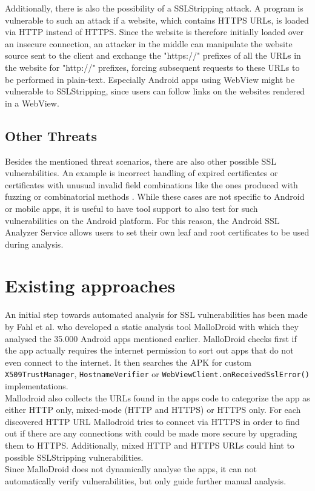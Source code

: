 \documentclass[draft,final]{vutinfth} %
\begin{document}
Additionally, there is also the possibility of a SSLStripping attack. A program is vulnerable to such an attack if a website, which contains HTTPS URLs, is loaded via HTTP instead of HTTPS. Since the website is therefore initially loaded over an insecure connection, an attacker in the middle can manipulate the website source sent to the client and exchange the "https://" prefixes of all the URLs in the website for "http://" prefixes, forcing subsequent requests to these URLs to be performed in plain-text. Especially Android apps using WebView might be vulnerable to SSLStripping, since users can follow links on the websites rendered in a WebView.

\section*{Other Threats}

Besides the mentioned threat scenarios, there are also other possible SSL vulnerabilities. An example is incorrect handling of expired certificates or certificates with unusual invalid field combinations like the ones produced with fuzzing or combinatorial methods \cite{Brubaker, Kleine}. While these cases are not specific to Android or mobile apps, it is useful to have tool support to also test for such vulnerabilities on the Android platform. For this reason, the Android SSL Analyzer Service allows users to set their own leaf and root certificates to be used during analysis. 

\chapter{Existing approaches}

An initial step towards automated analysis for SSL vulnerabilities has been made by Fahl et al. \cite{Fahl2012} who developed a static analysis tool MalloDroid with which they analysed the 35.000 Android apps mentioned earlier. MalloDroid checks first if the app actually requires the internet permission to sort out apps that do not even connect to the internet. 
It then searches the APK for custom \texttt{X509TrustManager}, \texttt{HostnameVerifier} or \texttt{WebViewClient.onReceivedSslError()} implementations. \\
Mallodroid also collects the URLs found in the apps code to categorize the app as either HTTP only, mixed-mode (HTTP and HTTPS) or HTTPS only. For each discovered HTTP URL Mallodroid tries to connect via HTTPS in order to find out if there are any connections with could be made more secure by upgrading them to HTTPS. Additionally, mixed HTTP and HTTPS URLs could hint to possible SSLStripping vulnerabilities. \\
Since MalloDroid does not dynamically analyse the apps, it can not automatically verify vulnerabilities, but only guide further manual analysis.
\end{document}
